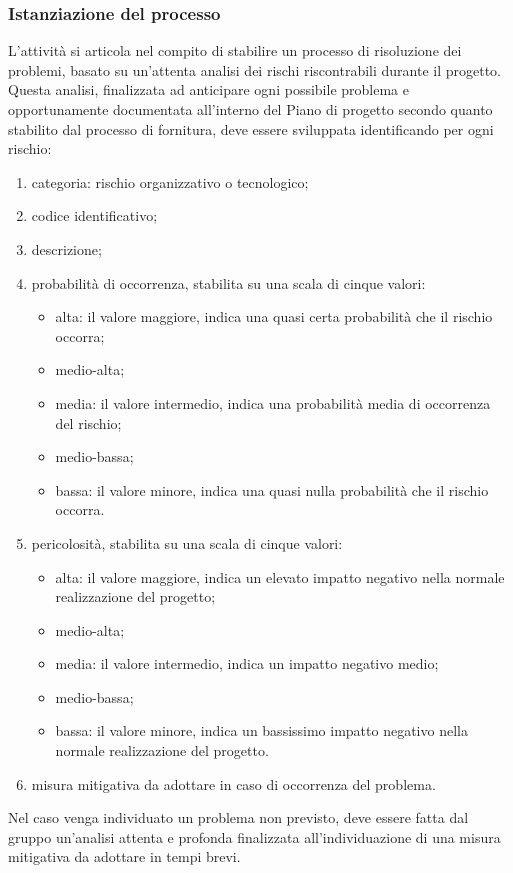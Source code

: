 \subsubsection{Istanziazione del processo}
L'attività si articola nel compito di stabilire un processo di risoluzione dei problemi, basato su un'attenta analisi dei rischi riscontrabili durante il progetto. Questa analisi, finalizzata ad anticipare ogni possibile problema e opportunamente documentata all'interno del Piano di progetto secondo quanto stabilito dal processo di fornitura, deve essere sviluppata identificando per ogni rischio:
\begin{enumerate}
    \item categoria: rischio organizzativo o tecnologico;
    \item codice identificativo;
    \item descrizione;
    \item probabilità di occorrenza, stabilita su una scala di cinque valori:
    \begin{itemize}
        \item alta: il valore maggiore, indica una quasi certa probabilità che il rischio occorra;
        \item medio-alta;
        \item media: il valore intermedio, indica una probabilità media di occorrenza del rischio;
        \item medio-bassa;
        \item bassa: il valore minore, indica una quasi nulla probabilità che il rischio occorra.
    \end{itemize}
    \item pericolosità, stabilita su una scala di cinque valori:
    \begin{itemize}
        \item alta: il valore maggiore, indica un elevato impatto negativo nella normale realizzazione del progetto;
        \item medio-alta;
        \item media: il valore intermedio, indica un impatto negativo medio;
        \item medio-bassa;
        \item bassa: il valore minore, indica un bassissimo impatto negativo nella normale realizzazione del progetto.
    \end{itemize}
    \item misura mitigativa da adottare in caso di occorrenza del problema.
\end{enumerate}
Nel caso venga individuato un problema non previsto, deve essere fatta dal gruppo un'analisi attenta e profonda finalizzata all'individuazione di una misura mitigativa da adottare in tempi brevi.
